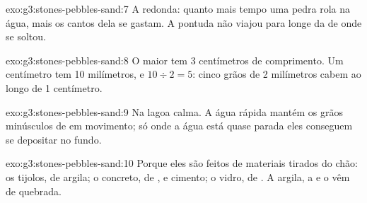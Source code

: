 \begin{solution}{exo:g3:stones-pebbles-sand:7}
A redonda: quanto mais tempo uma pedra rola na água, mais os cantos dela se
gastam. A pontuda não viajou para longe da  de onde se soltou.
\end{solution}

\begin{solution}{exo:g3:stones-pebbles-sand:8}
O maior  tem 3 centímetros de comprimento. Um centímetro tem 10
milímetros, e $10 \div 2 = 5$: cinco grãos de 2 milímetros cabem ao longo
de 1 centímetro.
\end{solution}

\begin{solution}{exo:g3:stones-pebbles-sand:9}
Na lagoa calma. A água rápida mantém os grãos minúsculos de  em
movimento; só onde a água está quase parada eles conseguem se depositar no fundo.
\end{solution}

\begin{solution}{exo:g3:stones-pebbles-sand:10}
Porque eles são feitos de materiais tirados do chão: os tijolos, de argila;
o concreto, de ,  e cimento; o vidro, de . A argila, a
 e o  vêm de  quebrada.
\end{solution}
